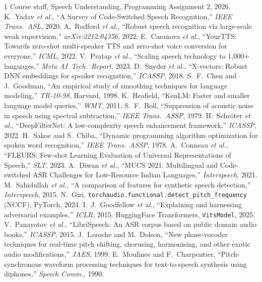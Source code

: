 \documentclass[conference]{IEEEtran}
\begin{document}
\begin{thebibliography}{1}
 Course staff, Speech Understanding, Programming Assignment 2, 2026.
 K.~Yadav \emph{et al.}, ``A Survey of Code-Switched Speech Recognition,'' \emph{IEEE Trans.~ASL}, 2020.
 A.~Radford \emph{et al.}, ``Robust speech recognition via large-scale weak supervision,'' \emph{arXiv:2212.04356}, 2022.
 E.~Casanova \emph{et al.}, ``YourTTS: Towards zero-shot multi-speaker TTS and zero-shot voice conversion for everyone,'' \emph{ICML}, 2022.
 V.~Pratap \emph{et al.}, ``Scaling speech technology to 1,000+ languages,'' \emph{Meta AI~Tech.~Report}, 2023.
 D.~Snyder \emph{et al.}, ``X-vectors: Robust DNN embeddings for speaker recognition,'' \emph{ICASSP}, 2018.
 S.~F.~Chen and J.~Goodman, ``An empirical study of smoothing techniques for language modeling,'' \emph{TR-10-98}, Harvard, 1998.
 K.~Heafield, ``KenLM: Faster and smaller language model queries,'' \emph{WMT}, 2011.
 S.~F.~Boll, ``Suppression of acoustic noise in speech using spectral subtraction,'' \emph{IEEE Trans.~ASSP}, 1979.
 H.~Schr\"oter \emph{et al.}, ``DeepFilterNet: A low-complexity speech enhancement framework,'' \emph{ICASSP}, 2022.
 H.~Sakoe and S.~Chiba, ``Dynamic programming algorithm optimization for spoken word recognition,'' \emph{IEEE Trans.~ASSP}, 1978.
 A.~Conneau \emph{et al.}, ``FLEURS: Few-shot Learning Evaluation of Universal Representations of Speech,'' \emph{SLT}, 2023.
 A.~Diwan \emph{et al.}, ``MUCS 2021: Multilingual and Code-switched ASR Challenges for Low-Resource Indian Languages,'' \emph{Interspeech}, 2021.
 M.~Sahidullah \emph{et al.}, ``A comparison of features for synthetic speech detection,'' \emph{Interspeech}, 2015.
 N.~Giri, \texttt{torchaudio.functional.detect\_pitch\_frequency} (NCCF), PyTorch, 2024.
 I.~J.~Goodfellow \emph{et al.}, ``Explaining and harnessing adversarial examples,'' \emph{ICLR}, 2015.
 HuggingFace Transformers, \texttt{VitsModel}, 2025.
 V.~Panayotov \emph{et al.}, ``LibriSpeech: An ASR corpus based on public domain audio books,'' \emph{ICASSP}, 2015.
 J.~Laroche and M.~Dolson, ``New phase-vocoder techniques for real-time pitch shifting, chorusing, harmonising, and other exotic audio modifications,'' \emph{JAES}, 1999.
 E.~Moulines and F.~Charpentier, ``Pitch-synchronous waveform processing techniques for text-to-speech synthesis using diphones,'' \emph{Speech Comm.}, 1990.
\end{thebibliography}
\end{document}
